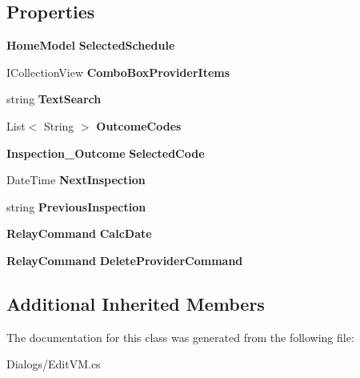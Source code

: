 \subsection*{Properties}
\begin{DoxyCompactItemize}
\item 
\mbox{\label{class_a_f_h___scheduler_1_1_dialogs_1_1_edit_v_m_ac8c9eb26bbf64a6e1f3d64a99ffccc4a}} 
\textbf{ Home\+Model} {\bfseries Selected\+Schedule}\hspace{0.3cm}{\ttfamily  [get, set]}
\item 
\mbox{\label{class_a_f_h___scheduler_1_1_dialogs_1_1_edit_v_m_acaa343d0f6bb95c1ac62720a6adc4f10}} 
I\+Collection\+View {\bfseries Combo\+Box\+Provider\+Items}\hspace{0.3cm}{\ttfamily  [get]}
\item 
\mbox{\label{class_a_f_h___scheduler_1_1_dialogs_1_1_edit_v_m_aa30fd144597f9e4e6f7a64c38c47ead2}} 
string {\bfseries Text\+Search}\hspace{0.3cm}{\ttfamily  [get, set]}
\item 
\mbox{\label{class_a_f_h___scheduler_1_1_dialogs_1_1_edit_v_m_a273fb36ba8e931f6c52210e6eace9fd1}} 
List$<$ String $>$ {\bfseries Outcome\+Codes}\hspace{0.3cm}{\ttfamily  [get, set]}
\item 
\mbox{\label{class_a_f_h___scheduler_1_1_dialogs_1_1_edit_v_m_a1a0798a5c152505a01661b7e74aa204d}} 
\textbf{ Inspection\+\_\+\+Outcome} {\bfseries Selected\+Code}\hspace{0.3cm}{\ttfamily  [get, set]}
\item 
\mbox{\label{class_a_f_h___scheduler_1_1_dialogs_1_1_edit_v_m_afd6a3f0ccc454980360f06ded386549d}} 
Date\+Time {\bfseries Next\+Inspection}\hspace{0.3cm}{\ttfamily  [get, set]}
\item 
\mbox{\label{class_a_f_h___scheduler_1_1_dialogs_1_1_edit_v_m_a81cd7a23e31ef3b39f45c288d6693a1e}} 
string {\bfseries Previous\+Inspection}\hspace{0.3cm}{\ttfamily  [get, set]}
\item 
\mbox{\label{class_a_f_h___scheduler_1_1_dialogs_1_1_edit_v_m_afd3a65deb8371f225b95b8f873efe241}} 
\textbf{ Relay\+Command} {\bfseries Calc\+Date}\hspace{0.3cm}{\ttfamily  [get]}
\item 
\mbox{\label{class_a_f_h___scheduler_1_1_dialogs_1_1_edit_v_m_a555cdd04c9f2c912de76298951d1200f}} 
\textbf{ Relay\+Command} {\bfseries Delete\+Provider\+Command}\hspace{0.3cm}{\ttfamily  [get]}
\end{DoxyCompactItemize}
\subsection*{Additional Inherited Members}


The documentation for this class was generated from the following file\+:\begin{DoxyCompactItemize}
\item 
Dialogs/Edit\+V\+M.\+cs\end{DoxyCompactItemize}
